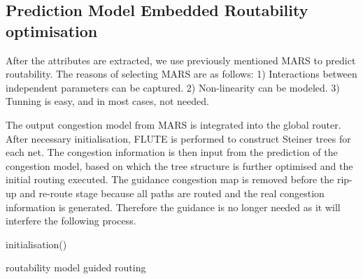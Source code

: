\subsection{Prediction Model Embedded Routability optimisation}
After the attributes are extracted, we use previously mentioned MARS \cite{MARS} to predict routability. The reasons of selecting MARS are as follows: 1) Interactions between independent parameters can be captured. 2) Non-linearity can be modeled. 3) Tunning is easy, and in most cases, not needed. 

The output congestion model from MARS is integrated into the global router. After necessary initialisation, FLUTE is performed to construct Steiner trees for each net. The congestion information is then input from the prediction of the congestion model, based on which the tree structure is further optimised and the initial routing executed. The guidance congestion map is removed before the rip-up and re-route stage because all paths are routed and the real congestion information is generated. Therefore the guidance is no longer needed as it will interfere the following process.

\begin{algorithm}
\SetAlgoLined
{}
 initialisation()\;
 \caption{routability model guided routing}
\end{algorithm}